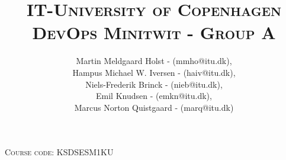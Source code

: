 \documentclass{article}
\title{
\textsc{\huge IT-University of Copenhagen}\\[1cm]
\textsc{\LARGE \textbf{DevOps Minitwit - Group A}}\\[1cm]
}
\author{
Martin Meldgaard Holst - (mmho@itu.dk),\\
Hampus Michael W. Iversen - (haiv@itu.dk),\\
Niels-Frederik Brinck - (nieb@itu.dk),\\
Emil Knudsen - (emkn@itu.dk),\\
Marcus Norton Quistgaard - (marq@itu.dk)}
\begin{document}
\maketitle
\begin{center}
\textsc{Course code: KSDSESM1KU}
\end{center}

\newpage
\tableofcontents
\newpage


\newpage

\newpage

\newpage


\newpage
\printbibliography
\end{document}
